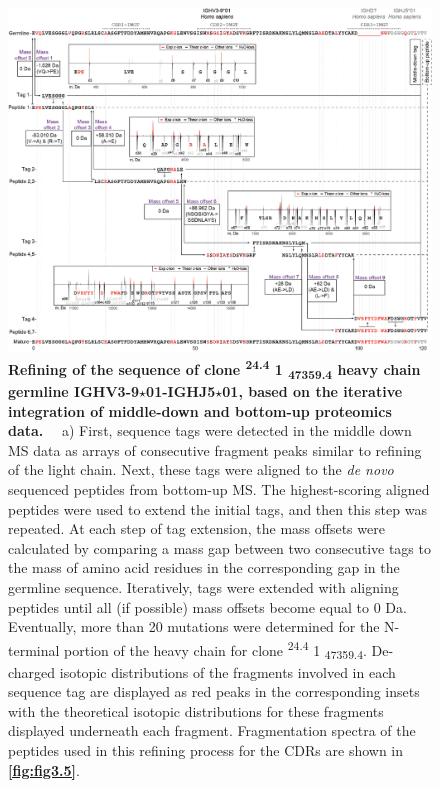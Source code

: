\begin{subappendices}
  \vspace{1cm}

  \begin{figure}[!ht]
    \center
    \includegraphics[]{Chapter.3/Figures/fs9.png}
    \caption{
      \textbf{Refining of the sequence of clone \textsuperscript{24.4} 1 \textsubscript{47359.4} heavy chain germline IGHV3-9$\star$01-IGHJ5$\star$01, based on the iterative integration of middle-down and bottom-up proteomics data.} ~~a) First, sequence tags were detected in the middle down MS data as arrays of consecutive fragment peaks similar to refining of the light chain. Next, these tags were aligned to the \emph{de novo} sequenced peptides from bottom-up MS. The highest-scoring aligned peptides were used to extend the initial tags, and then this step was repeated. At each step of tag extension, the mass offsets were calculated by comparing a mass gap between two consecutive tags to the mass of amino acid residues in the corresponding gap in the germline sequence. Iteratively, tags were extended with aligning peptides until all (if possible) mass offsets become equal to 0 Da. Eventually, more than 20 mutations were determined for the N-terminal portion of the heavy chain for clone \textsuperscript{24.4} 1 \textsubscript{47359.4}. De-charged isotopic distributions of the fragments involved in each sequence tag are displayed as red peaks in the corresponding insets with the theoretical isotopic distributions for these fragments displayed underneath each fragment. Fragmentation spectra of the peptides used in this refining process for the CDRs are shown in \textbf{\autoref{fig:fig3.5}}.
    }
    \label{fig:figs3.9}
  \end{figure}


\end{subappendices}
